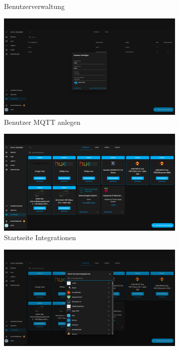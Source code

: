\begin{figure}[H]
\begin{subfigure}{.5\linewidth}
        \caption{Benutzerverwaltung}
        \label{fig:ha9}
    \end{subfigure}
    \begin{subfigure}{.5\linewidth}
        \includegraphics[width=1\textwidth]{img/HA11.png}
        \caption{Benutzer MQTT anlegen }
        \label{fig:ha10}
    \end{subfigure}
    \begin{subfigure}{.5\linewidth}
        \includegraphics[width=1\textwidth]{img/HA12.png}
        \caption{Startseite Integrationen }
        \label{fig:ha11}
    \end{subfigure}
    \begin{subfigure}{.5\linewidth}
        \includegraphics[width=1\textwidth]{img/HA13.png}

\end{subfigure}
\end{figure}
